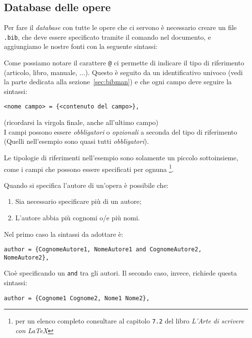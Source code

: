 \subsection{Database delle opere}
Per fare il \textit{database} con tutte le opere che ci servono è necessario
creare un file \texttt{.bib}, che deve essere specificato tramite il comando
\verb!! nel documento, e aggiungiamo le nostre
fonti con la seguente sintassi:

Come possiamo notare il carattere \verb!@! ci permette di indicare il tipo di
riferimento (articolo, libro, manuale, ...). Questo è seguito da un
identificativo univoco (vedi la parte dedicata alla sezione~\ref{sec:bibman})
e che ogni campo deve seguire la sintassi:
\begin{lstlisting}
<nome campo> = {<contenuto del campo>},
\end{lstlisting}
(ricordarsi la virgola finale, anche all'ultimo campo)\\
I campi possono essere \emph{obbligatori} o \emph{opzionali} a seconda del
tipo di riferimento (Quelli nell'esempio sono quasi tutti \emph{obbligatori}).
\par Le tipologie di riferimenti nell'esempio sono solamente un piccolo
sottoinsieme, come i campi che possono essere specificati per ognuna
\footnote{per un elenco completo consultare al capitolo \texttt{7.2} del libro
\textit{L'Arte di scrivere con \LaTeX{}}}.
\par Quando si specifica l'autore di un'opera è possibile che:
\begin{enumerate}
    \item Sia necessario specificare più di un autore;
    \item L'autore abbia più cognomi o/e più nomi.
\end{enumerate}
Nel primo caso la sintassi da adottare è:
\begin{lstlisting}
author = {CognomeAutore1, NomeAutore1 and CognomeAutore2, NomeAutore2},
\end{lstlisting}
Cioè specificando un \texttt{and} tra gli autori. Il secondo caso, invece,
richiede questa sintassi:
\begin{lstlisting}
author = {Cognome1 Cognome2, Nome1 Nome2},
\end{lstlisting}

